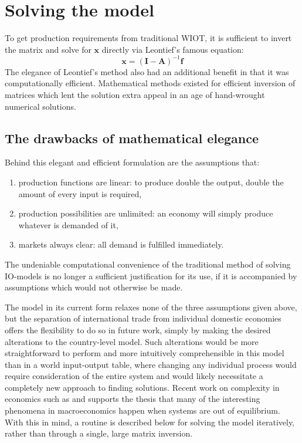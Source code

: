 \documentclass{article}
\begin{document}
\section{Solving the model}\label{sec:algorithm}
To get production requirements from traditional WIOT, it is sufficient to invert the matrix and solve for $\boldsymbol{x}$ directly via Leontief's famous equation:
\begin{equation}
\boldsymbol{x} = (\boldsymbol{I}- \boldsymbol{A})^{-1}\boldsymbol{f}
\end{equation}
The elegance of Leontief's method also had an additional benefit in that it was computationally efficient.
Mathematical methods existed for efficient inversion of matrices which lent the solution extra appeal in an age of hand-wrought numerical solutions.

\subsection{The drawbacks of mathematical elegance}
Behind this elegant and efficient formulation are the assumptions that:
\begin{enumerate}[i]
\itemsep 0em
\item production functions are linear: to produce double the output, double the amount of every input is required,
\item production possibilities are unlimited: an economy will simply produce whatever is demanded of it,
\item markets always clear: all demand is fulfilled immediately.
\end{enumerate}
The undeniable computational convenience of the traditional method of solving IO-models is no longer a sufficient justification for its use, if it is accompanied by assumptions which would not otherwise be made.

The model in its current form relaxes none of the three assumptions given above, but the separation of international trade from individual domestic economies offers the flexibility to do so in future work, simply by making the desired alterations to the country-level model.
Such alterations would be more straightforward to perform and more intuitively comprehensible in this model than in a world input-output table, where changing any individual process would require consideration of the entire system and would likely necessitate a completely new approach to finding solutions.
Recent work on complexity in economics such as \textcite{beinhocker_origin_2006} and \textcite{ramalingam_exploring_2009} supports the thesis that many of the interesting phenomena in macroeconomics happen when systems are out of equilibrium.
With this in mind, a routine is described below for solving the model iteratively, rather than through a single, large matrix inversion.
\end{document}
